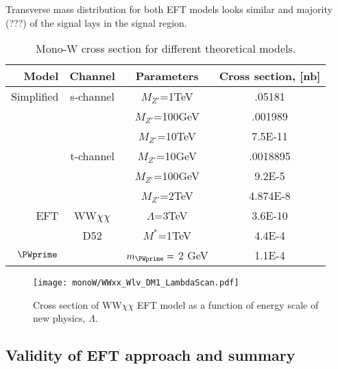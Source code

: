 Transverse mass distribution for both EFT models looks similar and majority (???) of the signal lays in the signal region. 


\begin{table}[]
  \begin{tabular}{r|c|c|c}
    Model 	& Channel 	  & Parameters	    & Cross section, [nb] \\
    \midrule
    Simplified  & s-channel	  & $M_{Z'}$=1TeV    & .05181 \\
		&		  & $M_{Z'}$=100GeV  & .001989 \\
		&		  & $M_{Z'}$=10TeV   & 7.5E-11 \\
		& t-channel	  & $M_{Z'}$=10GeV   & .0018895 \\
		&		  & $M_{Z'}$=100GeV  & 9.2E-5 \\
		&		  & $M_{Z'}$=2TeV    & 4.874E-8 \\
    \midrule
EFT 	& WW$\chi\chi$	  & $\Lambda$=3TeV    & 3.6E-10 \\
	& D52		  & $M^{*}$=1TeV	& 4.4E-4 \\
    \midrule	
$\PWprime$ 	& 	  & $m_{\PWprime} =$ 2 GeV   & 1.1E-4 \\    
  \end{tabular}
  \caption{Mono-W cross section for different theoretical models.}
  \label{tab:TriggerDetails}
\end{table}


\begin{figure}[]
 \texttt{[image: monoW/WWxx\_Wlv\_DM1\_LambdaScan.pdf]}
  \caption{Cross section of WW$\chi\chi$ EFT model as a function of energy scale of new physics, $\Lambda$.}
  \label{fig:lambdaScan}
\end{figure}

\subsection{Validity of EFT approach and summary}

